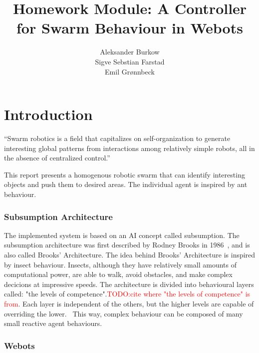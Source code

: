 \documentclass[a4paper]{article}
\title{Homework Module: A Controller for Swarm Behaviour in Webots}
\author{
    Aleksander Burkow \\
    Sigve Sebstian Farstad \\
    Emil Grønnbeck
}
\newcommand\TODO[1]{\textcolor{red}{TODO:#1}}
\newcommand\todo[1]{\TODO{#1}}
\begin{document}

\maketitle
\thispagestyle{empty}


\newpage

\tableofcontents

\newpage
\setcounter{page}{1}

\part{Introduction}
\label{part:proposed-system}

``Swarm robotics is a field that capitalizes on self-organization to generate interesting global patterns from interactions among relatively simple robots, all in the absence of centralized control.''~\cite{course-page}

This report presents a homogenous robotic swarm that can identify interesting objects and push them to desired areas.
The individual agent is inspired by ant behaviour.



\section{Subsumption Architecture}
The implemented system is based on an AI concept called subsumption.
The subsumption architecture was first described by Rodney Brooks in 1986~\cite{brooks}, and is also called Brooks' Architecture.
The idea behind Brooks' Architecture is inspired by insect behaviour.
Insects, although they have relatively small amounts of computational power, are able to walk, avoid obstacles, and make complex decicions at impressive speeds.
The architecture is divided into behavioural layers called: "the levels of competence".\todo{cite where "the levels of competence" is from}.
Each layer is independent of the others, but the higher levels are capable of overriding the lower.~\cite{mwarnerwu}
This way, complex behaviour can be composed of many small reactive agent behaviours.

\section{Webots}
\end{document}
